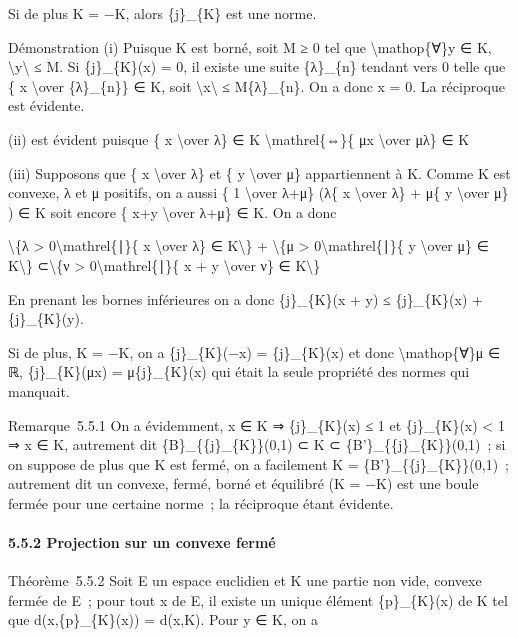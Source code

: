 \documentclass[]{article}
\begin{document}
Si de plus K = −K, alors \{j\}\_\{K\} est une norme.

Démonstration (i) Puisque K est borné, soit M ≥ 0 tel que
\textbackslash{}mathop\{∀\}y ∈ K,
\textbackslash{}\textbar{}y\textbackslash{}\textbar{} ≤ M. Si
\{j\}\_\{K\}(x) = 0, il existe une suite \{λ\}\_\{n\} tendant vers 0
telle que \{ x \textbackslash{}over \{λ\}\_\{n\}\} ∈ K, soit
\textbackslash{}\textbar{}x\textbackslash{}\textbar{} ≤ M\{λ\}\_\{n\}.
On a donc x = 0. La réciproque est évidente.

(ii) est évident puisque \{ x \textbackslash{}over λ\} ∈ K
\textbackslash{}mathrel\{⇔\}\{ μx \textbackslash{}over μλ\} ∈ K

(iii) Supposons que \{ x \textbackslash{}over λ\} et \{ y
\textbackslash{}over μ\} appartiennent à K. Comme K est convexe, λ et μ
positifs, on a aussi \{ 1 \textbackslash{}over λ+μ\} (λ\{ x
\textbackslash{}over λ\} + μ\{ y \textbackslash{}over μ\} ) ∈ K soit
encore \{ x+y \textbackslash{}over λ+μ\} ∈ K. On a donc

\textbackslash{}\{λ \textgreater{} 0\textbackslash{}mathrel\{∣\}\{ x
\textbackslash{}over λ\} ∈ K\textbackslash{}\} + \textbackslash{}\{μ
\textgreater{} 0\textbackslash{}mathrel\{∣\}\{ y \textbackslash{}over
μ\} ∈ K\textbackslash{}\} ⊂\textbackslash{}\{ν \textgreater{}
0\textbackslash{}mathrel\{∣\}\{ x + y \textbackslash{}over ν\} ∈
K\textbackslash{}\}

En prenant les bornes inférieures on a donc \{j\}\_\{K\}(x + y) ≤
\{j\}\_\{K\}(x) + \{j\}\_\{K\}(y).

Si de plus, K = −K, on a \{j\}\_\{K\}(−x) = \{j\}\_\{K\}(x) et donc
\textbackslash{}mathop\{∀\}μ ∈ ℝ, \{j\}\_\{K\}(μx) =
\textbar{}μ\textbar{}\{j\}\_\{K\}(x) qui était la seule propriété des
normes qui manquait.

Remarque~5.5.1 On a évidemment, x ∈ K ⇒ \{j\}\_\{K\}(x) ≤ 1 et
\{j\}\_\{K\}(x) \textless{} 1 ⇒ x ∈ K, autrement dit
\{B\}\_\{\{j\}\_\{K\}\}(0,1) ⊂ K ⊂ \{B'\}\_\{\{j\}\_\{K\}\}(0,1)~; si on
suppose de plus que K est fermé, on a facilement K =
\{B'\}\_\{\{j\}\_\{K\}\}(0,1)~; autrement dit un convexe, fermé, borné
et équilibré (K = −K) est une boule fermée pour une certaine norme~; la
réciproque étant évidente.

\paragraph{5.5.2 Projection sur un convexe fermé}

Théorème~5.5.2 Soit E un espace euclidien et K une partie non vide,
convexe fermée de E~; pour tout x de E, il existe un unique élément
\{p\}\_\{K\}(x) de K tel que d(x,\{p\}\_\{K\}(x)) = d(x,K). Pour y ∈ K,
on a
\end{document}
